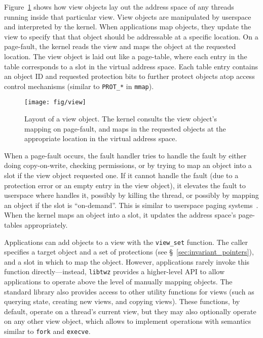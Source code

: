 {    Figure~\ref{fig:view} shows how view objects lay out the address space of any threads running inside
    that particular view. View objects are manipulated by userspace and interpreted by the kernel. When
    applications map objects, they update the view to specify that that object should be addressable at
    a specific location. On a page-fault, the kernel reads the view and maps the object at the requested
    location. The view object is laid out like a page-table, where each entry in the table corresponds
    to a slot in the virtual address space. Each table entry contains an object ID and requested
    protection bits to further protect objects atop access control mechanisms (similar to
    \texttt{PROT\_*} in \texttt{mmap}).

    \begin{figure}
        \centering
        \texttt{[image: fig/view]}
        \caption{Layout of a view object. The kernel consults the view object's mapping on page-fault,
            and maps in the requested objects at the appropriate location in the virtual address space.}
        \label{fig:view}
    \end{figure}

    When a page-fault occurs, the fault handler tries to handle the fault by either doing copy-on-write,
    checking permissions, or by trying to map an object into a slot if the view object requested one.
    If it cannot handle the fault (due to a protection error or an empty entry in the view
    object), it elevates the fault to userspace where \libcore handles it, possibly by killing the
    thread, or possibly by mapping an object if the slot is ``on-demand''. This is similar to userspace
    paging systems~\cite{l4,accetta:usenix86s}. When the kernel
    maps an object into a slot, it updates the address space's page-tables appropriately.

    Applications can add objects to a view with the \texttt{view\_set} function. The caller specifies a
    target object and a set of protections (see \S~\ref{sec:invariant_pointers}), and a slot in which to
    map the object. However, applications rarely invoke this function directly---instead,
    \texttt{libtwz} provides a higher-level API to allow applications to operate above the level of
    manually mapping objects. The standard library also provides access to other utility functions for
    views (such as querying state, creating new views, and copying views). These functions, by default,
    operate on a thread's current view, but they may also optionally operate on any other view object,
    which allows \Twizzler to implement operations with semantics similar to \texttt{fork} and \texttt{execve}.

}
